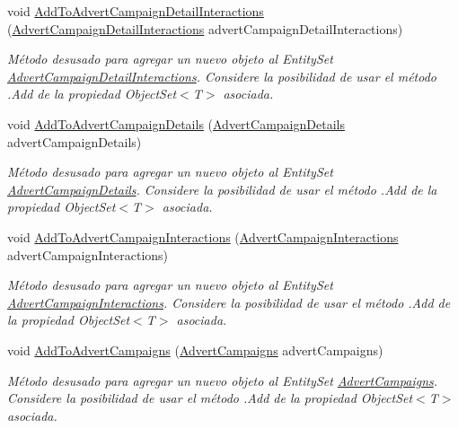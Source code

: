 \begin{DoxyCompactItemize}
void \hyperlink{class_game_memory_1_1_o_m_k_t_d_b_entities_a2b013b78ec8bc9c3598a86d1c7f5b06f}{Add\-To\-Advert\-Campaign\-Detail\-Interactions} (\hyperlink{class_game_memory_1_1_advert_campaign_detail_interactions}{Advert\-Campaign\-Detail\-Interactions} advert\-Campaign\-Detail\-Interactions)
\begin{DoxyCompactList}\small\item\em Método desusado para agregar un nuevo objeto al Entity\-Set \hyperlink{class_game_memory_1_1_advert_campaign_detail_interactions}{Advert\-Campaign\-Detail\-Interactions}. Considere la posibilidad de usar el método .Add de la propiedad Object\-Set$<$T$>$ asociada. \end{DoxyCompactList}\item 
void \hyperlink{class_game_memory_1_1_o_m_k_t_d_b_entities_a2a1ff115c82b822436dfc177b47d2523}{Add\-To\-Advert\-Campaign\-Details} (\hyperlink{class_game_memory_1_1_advert_campaign_details}{Advert\-Campaign\-Details} advert\-Campaign\-Details)
\begin{DoxyCompactList}\small\item\em Método desusado para agregar un nuevo objeto al Entity\-Set \hyperlink{class_game_memory_1_1_advert_campaign_details}{Advert\-Campaign\-Details}. Considere la posibilidad de usar el método .Add de la propiedad Object\-Set$<$T$>$ asociada. \end{DoxyCompactList}\item 
void \hyperlink{class_game_memory_1_1_o_m_k_t_d_b_entities_a44fb4c2c2cd41a93cc34dddc16cd4071}{Add\-To\-Advert\-Campaign\-Interactions} (\hyperlink{class_game_memory_1_1_advert_campaign_interactions}{Advert\-Campaign\-Interactions} advert\-Campaign\-Interactions)
\begin{DoxyCompactList}\small\item\em Método desusado para agregar un nuevo objeto al Entity\-Set \hyperlink{class_game_memory_1_1_advert_campaign_interactions}{Advert\-Campaign\-Interactions}. Considere la posibilidad de usar el método .Add de la propiedad Object\-Set$<$T$>$ asociada. \end{DoxyCompactList}\item 
void \hyperlink{class_game_memory_1_1_o_m_k_t_d_b_entities_a9a897797208a4e7187c478d9fe9f90b7}{Add\-To\-Advert\-Campaigns} (\hyperlink{class_game_memory_1_1_advert_campaigns}{Advert\-Campaigns} advert\-Campaigns)
\begin{DoxyCompactList}\small\item\em Método desusado para agregar un nuevo objeto al Entity\-Set \hyperlink{class_game_memory_1_1_advert_campaigns}{Advert\-Campaigns}. Considere la posibilidad de usar el método .Add de la propiedad Object\-Set$<$T$>$ asociada. \end{DoxyCompactList}\item 

\end{DoxyCompactItemize}
